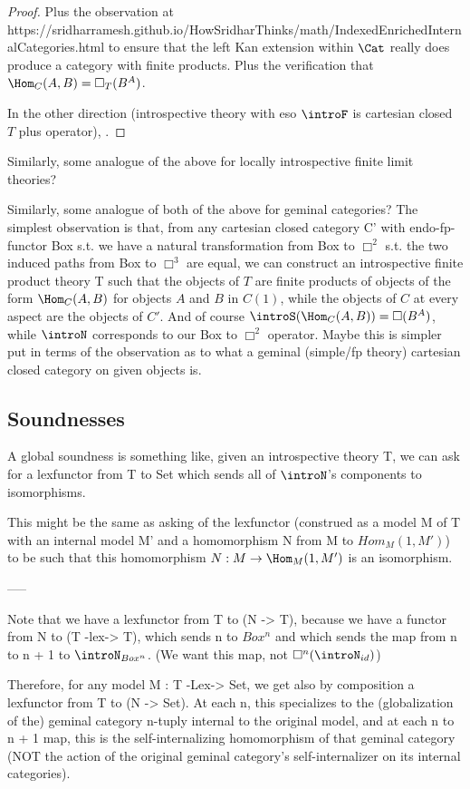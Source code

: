 \begin{proof}
Plus the observation at https://sridharramesh.github.io/HowSridharThinks/math/IndexedEnrichedInternalCategories.html to ensure that the left Kan extension within $\Cat$ really does produce a category with finite products. Plus the verification that $\Hom_C(A, B) = \Box_T (B^A)$.

In the other direction (introspective theory with eso $\introF$ is cartesian closed $T$ plus operator), \TODO.
\end{proof}
Similarly, some analogue of the above for locally introspective finite limit theories? \TODO

\begin{TODOblock}
Similarly, some analogue of both of the above for geminal categories? The simplest observation is that, from any cartesian closed category C' with endo-fp-functor Box s.t. we have a natural transformation from Box to $\Box^2$ s.t. the two induced paths from Box to $\Box^3$ are equal, we can construct an introspective finite product theory T such that the objects of $T$ are finite products of objects of the form $\Hom_C(A, B)$ for objects $A$ and $B$ in $C(1)$, while the objects of $C$ at every aspect are the objects of $C'$. And of course $\introS(\Hom_C(A, B)) = \Box(B^A)$, while $\introN$ corresponds to our Box to $\Box^2$ operator. Maybe this is simpler put in terms of the observation as to what a geminal (simple/fp theory) cartesian closed category on given objects is.
\end{TODOblock}

\subsection{Soundnesses}
\TODO

A global soundness is something like, given an introspective theory T, we can ask for a lexfunctor from T to Set which sends all of $\introN$'s components to isomorphisms.

This might be the same as asking of the lexfunctor (construed as a model M of T with an internal model M' and a homomorphism N from M to $Hom_M(1, M')$) to be such that this homomorphism $N : M \to \Hom_M(1, M')$ is an isomorphism.

-----

Note that we have a lexfunctor from T to (N -> T), because we have a functor from N to (T -lex-> T), which sends n to $Box^n$ and which sends the map from n to n + 1 to $\introN_{Box^n}$. (We want this map, not $\Box^n (\introN_{id})$)

Therefore, for any model M : T -Lex-> Set, we get also by composition a lexfunctor from T to (N -> Set). At each n, this specializes to the (globalization of the) geminal category n-tuply internal to the original model, and at each n to n + 1 map, this is the self-internalizing homomorphism of that geminal category (NOT the action of the original geminal category's self-internalizer on its internal categories).

